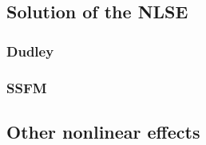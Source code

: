         \subsection{Solution of the NLSE}
            \subsubsection{Dudley}
            \subsubsection{SSFM}
            
        \subsection{Other nonlinear effects}


